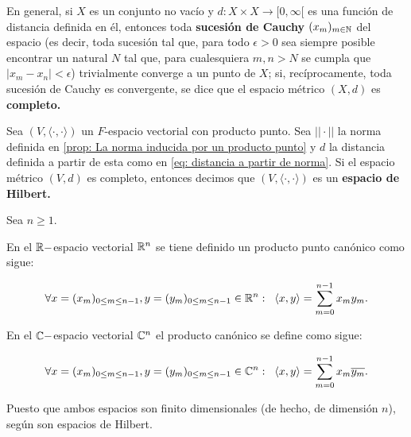 En general, si $X$ es un conjunto no vacío y 
$d: X \times X \longrightarrow [0, \infty[$ es una función de distancia
definida en él, entonces toda \textbf{sucesión de Cauchy}
$(x_{m})_{m \in \mathbb{N}}$ del espacio (es decir, toda sucesión
tal que, para todo $\epsilon >0$ sea siempre posible encontrar
un natural $N$ tal que, para cualesquiera $m, n >N$ se cumpla que
$|x_{m}-x_{n}| < \epsilon$) trivialmente converge a un punto
de $X$; 
si, recíprocamente, toda sucesión de Cauchy es convergente, 
se dice que el espacio métrico $(X, d)$ es \textbf{completo.}



\begin{defi}
\label{def: espacio de Hilbert}
Sea $(V, \langle \cdot , \cdot \rangle )$ un $F$-espacio
vectorial con producto punto. Sea $|| \cdot ||$ la norma definida en
\ref{prop: La norma inducida por un producto punto} y 
$d$ la distancia definida a partir de esta como en 
\eqref{eq: distancia a partir de norma}. Si el espacio
métrico $(V, d)$ es completo, entonces decimos que 
$(V, \langle \cdot , \cdot \rangle )$ es un \textbf{espacio de Hilbert.}
\end{defi}


\begin{ejemplo}
Sea $n \geq 1$.

En el $\mathbb{R}-$espacio vectorial $\mathbb{R}^{n}$ se tiene definido un 
producto punto canónico como sigue:

\begin{equation}
\label{eq: producto punto Rn}
\forall x=(x_{m})_{0 \leq m \leq n-1}, 
y=(y_{m})_{0 \leq m \leq n-1} \in \mathbb{R}^{n}: \hspace{0.2cm}
\langle x, y \rangle = \sum\limits_{m=0}^{n-1}x_{m} y_{m}.
\end{equation}

\noindent
En el $\mathbb{C}-$espacio vectorial $\mathbb{C}^{n}$ el producto canónico
se define como sigue: 


\begin{equation}
\label{eq: producto punto Cn}
\forall x=(x_{m})_{0 \leq m \leq n-1}, 
y=(y_{m})_{0 \leq m \leq n-1} \in \mathbb{C}^{n}: \hspace{0.2cm}
\langle x, y \rangle = \sum\limits_{m=0}^{n-1}x_{m} \overline{y_{m}}.
\end{equation}

Puesto que ambos espacios son finito dimensionales
(de hecho, de dimensión $n$), según \cite{mse3}
son espacios de Hilbert.
\final
\end{ejemplo}
